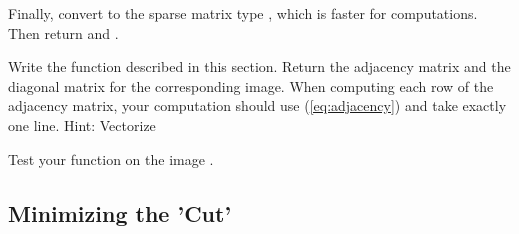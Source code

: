 Finally, convert  to the sparse matrix type , which is faster for computations. Then return  and .

\begin{problem}
Write the function  described in this section.  Return the adjacency matrix and the diagonal matrix for the corresponding image.
When computing each row of the adjacency matrix, your computation should use (\ref{eq:adjacency}) and take exactly one line.  Hint: Vectorize

Test your function on the image .


\label{prob:adjacency_dream}
\end{problem}

\subsection*{Minimizing the 'Cut'}

